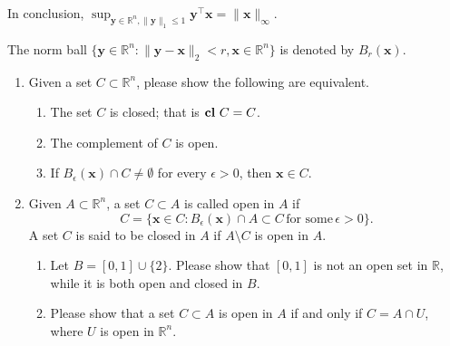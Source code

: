 \documentclass[11pt,letter,notitlepage]{article}
\DeclareMathOperator*{\cl}{\bf cl\,}
\theoremstyle{definition}
\begin{document}
\begin{solution}
\begin{enumerate}
\begin{enumerate}
		In conclusion, $\sup_{\mathbf{y}\in \mathbb{R}^n, \|\mathbf{y}\|_1\le 1}\mathbf{y}^{\top}\mathbf{x} = \|\mathbf{x}\|_{\infty}$.
	\end{enumerate}
\end{enumerate}
\end{solution}

\newpage

\begin{exercise}
    The norm ball $\{\mathbf{y} \in \mathbb{R}^n:\|\mathbf{y}-\mathbf{x}\|_2<r, \mathbf{x}\in \mathbb{R}^n\}$ is denoted by $B_r(\mathbf{x})$.
    \begin{enumerate}
        \item Given a set $C \subset \mathbb{R}^n$, please show the following are equivalent.
        \begin{enumerate}
            \item The set $C$ is closed; that is $\cl C=C$.
            \item The complement of $C$ is open.
            \item If $B_{\epsilon}(\mathbf{x})\cap C \not=\emptyset$ for every $\epsilon>0$, then $\mathbf{x}\in C$.
        \end{enumerate}
        \item Given $A\subset\mathbb{R}^n$, a set $C\subset A$ is called open in $A$ if $$C=\{\mathbf{x}\in C: B_{\epsilon}(\mathbf{x})\cap A \subset C\,\text{for some}\, \epsilon>0\}.$$
        A set $C$ is said to be closed in $A$ if $A\setminus C$ is open in $A$.
        \begin{enumerate}
            \item Let $B= [0,1] \cup \{2\}$.  Please show that $[0,1]$ is not an open set in $\mathbb{R}$, while it is both open and closed in $B$.
            \item Please show that a set $C \subset A$ is open in $A$ if and only if $C=A\cap U$, where $U$ is open in $\mathbb{R}^n$.
        \end{enumerate}

    \end{enumerate}
\end{exercise}

\newpage
\end{document}
